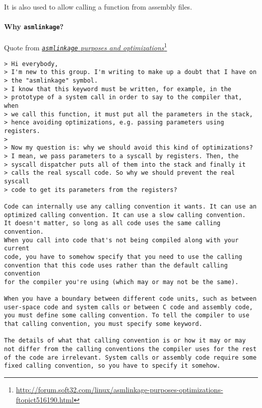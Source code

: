 It is also used to allow calling a function from assembly files.

\paragraph{Why \texttt{asmlinkage}?}
Quote from \href{http://forum.soft32.com/linux/asmlinkage-purposes-optimizations-ftopict516190.html}{\emph{\texttt{asmlinkage} purposes and optimizations}}\footnote{\url{http://forum.soft32.com/linux/asmlinkage-purposes-optimizations-ftopict516190.html}}

\begin{verbatim}
> Hi everybody, 
> I'm new to this group. I'm writing to make up a doubt that I have on 
> the "asmlinkage" symbol. 
> I know that this keyword must be written, for example, in the 
> prototype of a system call in order to say to the compiler that, when 
> we call this function, it must put all the parameters in the stack, 
> hence avoiding optimizations, e.g. passing parameters using registers. 
> 
> Now my question is: why we should avoid this kind of optimizations? 
> I mean, we pass parameters to a syscall by registers. Then, the 
> syscall dispatcher puts all of them into the stack and finally it 
> calls the real syscall code. So why we should prevent the real syscall 
> code to get its parameters from the registers? 

Code can internally use any calling convention it wants. It can use an
optimized calling convention. It can use a slow calling convention.
It doesn't matter, so long as all code uses the same calling convention.
When you call into code that's not being compiled along with your current
code, you have to somehow specify that you need to use the calling
convention that this code uses rather than the default calling convention
for the compiler you're using (which may or may not be the same).

When you have a boundary between different code units, such as between 
user-space code and system calls or between C code and assembly code, 
you must define some calling convention. To tell the compiler to use 
that calling convention, you must specify some keyword. 

The details of what that calling convention is or how it may or may 
not differ from the calling conventions the compiler uses for the rest 
of the code are irrelevant. System calls or assembly code require some 
fixed calling convention, so you have to specify it somehow. 
\end{verbatim}

